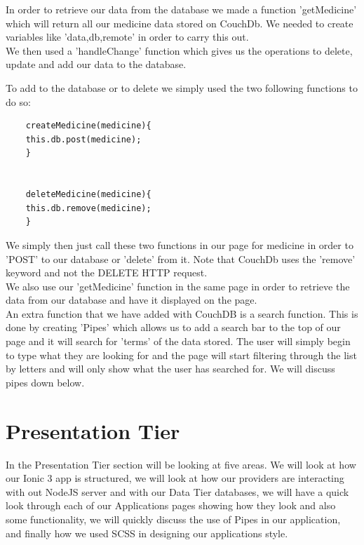 \documentclass[12pt,a4paper,oneside,openany]{book}
\begin{document}
In order to retrieve our data from the database we made a function 'getMedicine' which will return all our medicine data stored on CouchDb. We needed to create variables like 'data,db,remote' in order to carry this out.\\


We then used a 'handleChange' function which gives us the operations to delete, update and add our data to the database.

To add to the database or to delete we simply used the two following functions to do so:\\
\begin{verbatim}
    createMedicine(medicine){
    this.db.post(medicine);
    }
    

    deleteMedicine(medicine){
    this.db.remove(medicine);
    }
\end{verbatim}

\newline

We simply then just call these two functions in our page for medicine in order to 'POST' to our database or 'delete' from it. Note that CouchDb uses the 'remove' keyword and not the DELETE HTTP request.\\

We also use our 'getMedicine' function in the same page in order to retrieve the data from our database and have it displayed on the page.\\

An extra function that we have added with CouchDB is a search function. This is done by creating 'Pipes' which allows us to add a search bar to the top of our page and it will search for 'terms' of the data stored. The user will simply begin to type what they are looking for and the page will start filtering through the list by letters and will only show what the user has searched for. We will discuss pipes down below.

\section{Presentation Tier}
In the Presentation Tier section will be looking at five areas. We will look at how our Ionic 3 app is structured, we will look at how our providers are interacting with out NodeJS server and with our Data Tier databases, we will have a quick look through each of our Applications pages showing how they look and also some functionality, we will quickly discuss the use of Pipes in our application, and finally how we used SCSS in designing our applications style.
\end{document}
